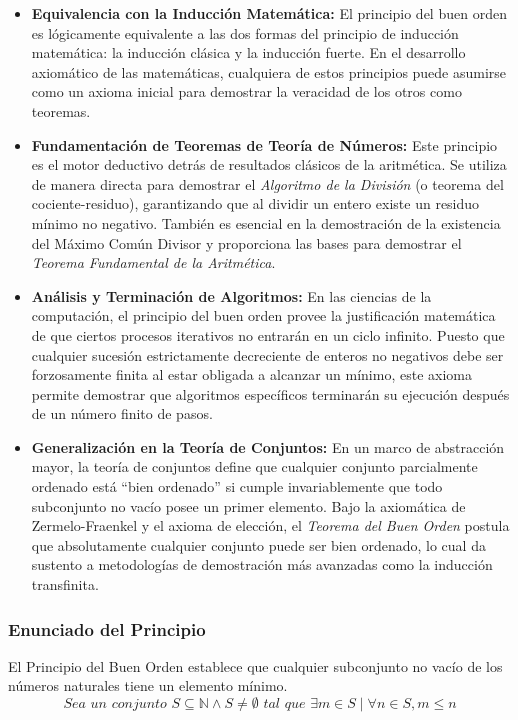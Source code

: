 \documentclass{article}
\begin{document}
\begin{itemize}    
    \item \textbf{Equivalencia con la Inducción Matemática:} El principio del buen orden es lógicamente equivalente a las dos formas del principio de inducción matemática: la inducción clásica y la inducción fuerte. En el desarrollo axiomático de las matemáticas, cualquiera de estos principios puede asumirse como un axioma inicial para demostrar la veracidad de los otros como teoremas.
    \item \textbf{Fundamentación de Teoremas de Teoría de Números:} Este principio es el motor deductivo detrás de resultados clásicos de la aritmética. Se utiliza de manera directa para demostrar el \textit{Algoritmo de la División} (o teorema del cociente-residuo), garantizando que al dividir un entero existe un residuo mínimo no negativo. También es esencial en la demostración de la existencia del Máximo Común Divisor y proporciona las bases para demostrar el \textit{Teorema Fundamental de la Aritmética}.
    \item \textbf{Análisis y Terminación de Algoritmos:} En las ciencias de la computación, el principio del buen orden provee la justificación matemática de que ciertos procesos iterativos no entrarán en un ciclo infinito. Puesto que cualquier sucesión estrictamente decreciente de enteros no negativos debe ser forzosamente finita al estar obligada a alcanzar un mínimo, este axioma permite demostrar que algoritmos específicos terminarán su ejecución después de un número finito de pasos.
    \item \textbf{Generalización en la Teoría de Conjuntos:} En un marco de abstracción mayor, la teoría de conjuntos define que cualquier conjunto parcialmente ordenado está ``bien ordenado'' si cumple invariablemente que todo subconjunto no vacío posee un primer elemento. Bajo la axiomática de Zermelo-Fraenkel y el axioma de elección, el \textit{Teorema del Buen Orden} postula que absolutamente cualquier conjunto puede ser bien ordenado, lo cual da sustento a metodologías de demostración más avanzadas como la inducción transfinita.
\end{itemize}

\subsubsection{Enunciado del Principio}
\label{sec:enunciado-buen-orden}

\noindent El Principio del Buen Orden establece que cualquier subconjunto no vacío de los números naturales tiene un elemento mínimo.
\[
\boxed{\textit{Sea un conjunto } S \subseteq \mathbb{N} \land S \neq \emptyset \textit{ tal que } \exists m \in S \mid \forall n \in S, m \le n}
\]
\end{document}
